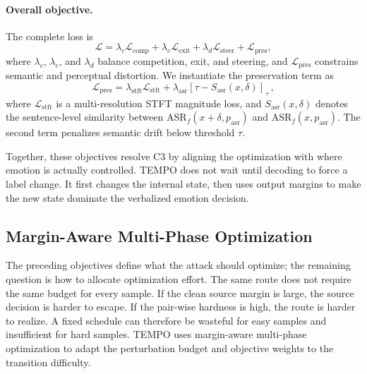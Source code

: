 \paragraph{Overall objective.}
The complete loss is
\begin{equation}
\mathcal{L}
=
\lambda_c \mathcal{L}_{\mathrm{comp}}
+
\lambda_e \mathcal{L}_{\mathrm{exit}}
+
\lambda_d \mathcal{L}_{\mathrm{steer}}
+
\mathcal{L}_{\mathrm{pres}},
\label{eq:tempo-overall}
\end{equation}
where $\lambda_c$, $\lambda_e$, and $\lambda_d$ balance competition, exit, and steering, and $\mathcal{L}_{\mathrm{pres}}$ constrains semantic and perceptual distortion. We instantiate the preservation term as
\begin{equation}
\mathcal{L}_{\mathrm{pres}}
=
\lambda_{\mathrm{stft}}\mathcal{L}_{\mathrm{stft}}
+
\lambda_{\mathrm{asr}}\left[\tau-S_{\mathrm{asr}}(x,\delta)\right]_+,
\label{eq:tempo-preservation}
\end{equation}
where $\mathcal{L}_{\mathrm{stft}}$ is a multi-resolution STFT magnitude loss, and $S_{\mathrm{asr}}(x,\delta)$ denotes the sentence-level similarity between $\mathrm{ASR}_{f}(x+\delta,p_{\mathrm{asr}})$ and $\mathrm{ASR}_{f}(x,p_{\mathrm{asr}})$. The second term penalizes semantic drift below threshold $\tau$.

Together, these objectives resolve C3 by aligning the optimization with where emotion is actually controlled. TEMPO does not wait until decoding to force a label change. It first changes the internal state, then uses output margins to make the new state dominate the verbalized emotion decision.

\subsection{Margin-Aware Multi-Phase Optimization}
\label{subsec:tempo-optimization}

The preceding objectives define what the attack should optimize; the remaining question is how to allocate optimization effort. The same route does not require the same budget for every sample. If the clean source margin is large, the source decision is harder to escape. If the pair-wise hardness is high, the route is harder to realize. A fixed schedule can therefore be wasteful for easy samples and insufficient for hard samples. TEMPO uses margin-aware multi-phase optimization to adapt the perturbation budget and objective weights to the transition difficulty.

